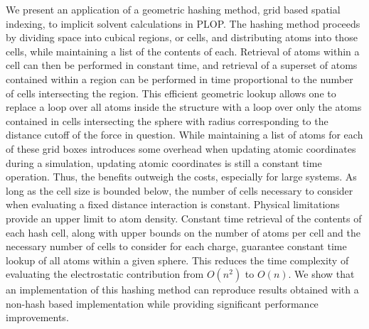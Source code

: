 We present an application of a geometric hashing method, grid based spatial indexing, to implicit solvent calculations in PLOP.
The hashing method proceeds by dividing space into cubical regions, or cells, and distributing atoms into those cells, while maintaining a list of the contents of each.
Retrieval of atoms within a cell can then be performed in constant time, and retrieval of a superset of atoms contained within a region can be performed in time proportional to the number of cells intersecting the region.
This efficient geometric lookup allows one to replace a loop over all atoms inside the structure with a loop over only the atoms contained in cells intersecting the sphere with radius corresponding to the distance cutoff of the force in question.
While maintaining a list of atoms for each of these grid boxes introduces some overhead when updating atomic coordinates during a simulation, updating atomic coordinates is still a constant time operation.
Thus, the benefits outweigh the costs, especially for large systems.
As long as the cell size is bounded below, the number of cells necessary to consider when evaluating a fixed distance interaction is constant.
Physical limitations provide an upper limit to atom density.
Constant time retrieval of the contents of each hash cell, along with upper bounds on the number of atoms per cell and the necessary number of cells to consider for each charge, guarantee constant time lookup of all atoms within a given sphere.
This reduces the time complexity of evaluating the electrostatic contribution from $O(n^2)$ to $O(n)$.
We show that an implementation of this hashing method can reproduce results obtained with a non-hash based implementation while providing significant performance improvements.
